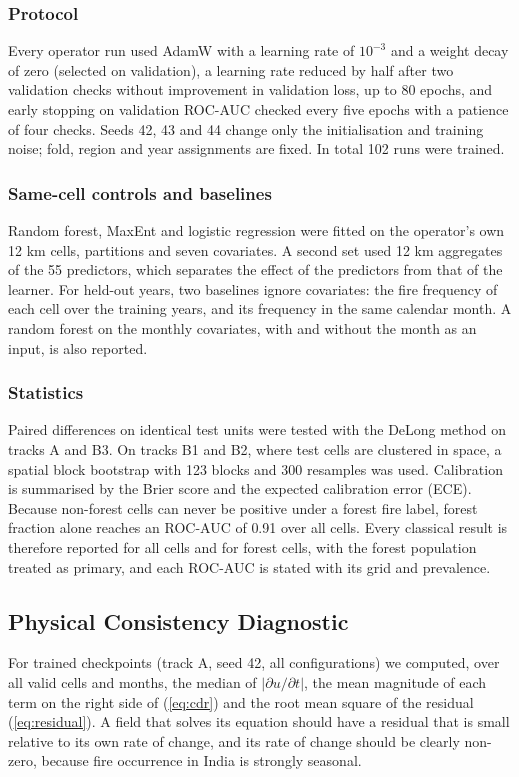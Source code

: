 \documentclass[journal]{IEEEtran}
\newcommand{\auc}{ROC-AUC}
\begin{document}
\subsubsection{Protocol}
Every operator run used AdamW with a learning rate of $10^{-3}$ and a weight decay of zero (selected on validation), a learning rate reduced by half after two validation checks without improvement in validation loss, up to 80 epochs, and early stopping on validation \auc{} checked every five epochs with a patience of four checks. Seeds 42, 43 and 44 change only the initialisation and training noise; fold, region and year assignments are fixed. In total 102 runs were trained.

\subsubsection{Same-cell controls and baselines}
Random forest, MaxEnt and logistic regression were fitted on the operator's own 12 km cells, partitions and seven covariates. A second set used 12 km aggregates of the 55 predictors, which separates the effect of the predictors from that of the learner. For held-out years, two baselines ignore covariates: the fire frequency of each cell over the training years, and its frequency in the same calendar month. A random forest on the monthly covariates, with and without the month as an input, is also reported.

\subsubsection{Statistics}
Paired differences on identical test units were tested with the DeLong method \cite{delong1988} on tracks A and B3. On tracks B1 and B2, where test cells are clustered in space, a spatial block bootstrap with 123 blocks and 300 resamples was used. Calibration is summarised by the Brier score and the expected calibration error (ECE). Because non-forest cells can never be positive under a forest fire label, forest fraction alone reaches an \auc{} of 0.91 over all cells. Every classical result is therefore reported for all cells and for forest cells, with the forest population treated as primary, and each \auc{} is stated with its grid and prevalence.

\subsection{Physical Consistency Diagnostic}
For trained checkpoints (track A, seed 42, all configurations) we computed, over all valid cells and months, the median of $|\partial u/\partial t|$, the mean magnitude of each term on the right side of (\ref{eq:cdr}) and the root mean square of the residual (\ref{eq:residual}). A field that solves its equation should have a residual that is small relative to its own rate of change, and its rate of change should be clearly non-zero, because fire occurrence in India is strongly seasonal.
\end{document}
